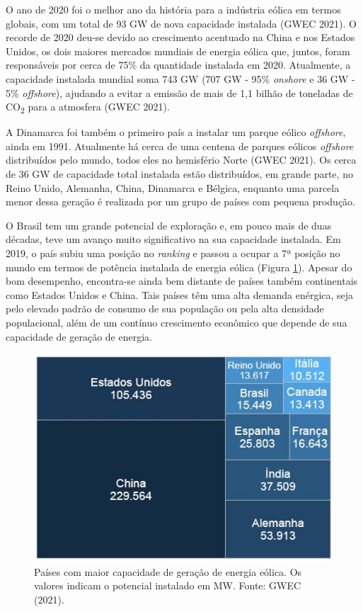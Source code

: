 \documentclass[
  oneside]{scrbook}
\begin{document}
O ano de 2020 foi o melhor ano da história para a indústria eólica em termos globais, com um total de 93 GW de nova capacidade instalada (GWEC 2021). O recorde de 2020 deu-se devido ao crescimento acentuado na China e nos Estados Unidos, os dois maiores mercados mundiais de energia eólica que, juntos, foram responsáveis por cerca de 75\% da quantidade instalada em 2020. Atualmente, a capacidade instalada mundial soma 743 GW (707 GW - 95\% \emph{onshore} e 36 GW - 5\% \emph{offshore}), ajudando a evitar a emissão de mais de 1,1 bilhão de toneladas de CO\textsubscript{2} para a atmosfera (GWEC 2021).

A Dinamarca foi também o primeiro país a instalar um parque eólico \emph{offshore}, ainda em 1991. Atualmente há cerca de uma centena de parques eólicos \emph{offshore} distribuídos pelo mundo, todos eles no hemisfério Norte (GWEC 2021). Os cerca de 36 GW de capacidade total instalada estão distribuídos, em grande parte, no Reino Unido, Alemanha, China, Dinamarca e Bélgica, enquanto uma parcela menor dessa geração é realizada por um grupo de países com pequena produção.

O Brasil tem um grande potencial de exploração e, em pouco mais de duas décadas, teve um avanço muito significativo na sua capacidade instalada. Em 2019, o país subiu uma posição no \emph{ranking} e passou a ocupar a 7ª posição no mundo em termos de potência instalada de energia eólica (Figura \ref{fig:07}). Apesar do bom desempenho, encontra-se ainda bem distante de países também continentais como Estados Unidos e China. Tais países têm uma alta demanda enérgica, seja pelo elevado padrão de consumo de sua população ou pela alta densidade populacional, além de um contínuo crescimento econômico que depende de sua capacidade de geração de energia.

\begin{figure}[H]

{\centering \includegraphics[width=0.7\linewidth]{imagens/cap01/Figura_1.7} 

}

\caption{Países com maior capacidade de geração de energia eólica. Os valores indicam o potencial instalado em MW. Fonte: GWEC (2021).}\label{fig:07}
\end{figure}
\end{document}

